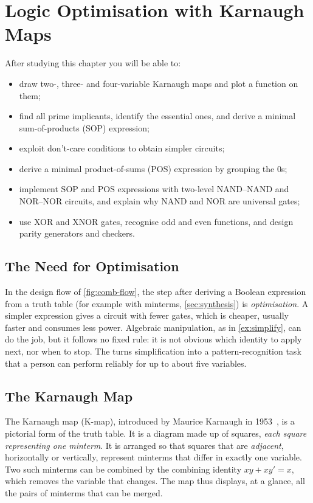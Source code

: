 \chapter{Logic Optimisation with Karnaugh Maps}\label{ch:kmap}

\begin{objectives}
After studying this chapter you will be able to:
\begin{itemize}
  \item draw two-, three- and four-variable Karnaugh maps and plot a function on them;
  \item find all prime implicants, identify the essential ones, and derive a minimal sum-of-products (SOP) expression;
  \item exploit don't-care conditions to obtain simpler circuits;
  \item derive a minimal product-of-sums (POS) expression by grouping the 0s;
  \item implement SOP and POS expressions with two-level NAND--NAND and NOR--NOR circuits, and explain why NAND and NOR are universal gates;
  \item use XOR and XNOR gates, recognise odd and even functions, and design parity generators and checkers.
\end{itemize}
\end{objectives}

\section{The Need for Optimisation}
In the design flow of \cref{fig:comb-flow}, the step after deriving a Boolean expression from a truth table (for example with minterms, \cref{sec:synthesis}) is \emph{optimisation}. A simpler expression gives a circuit with fewer gates, which is cheaper, usually faster and consumes less power. Algebraic manipulation, as in \cref{ex:simplify}, can do the job, but it follows no fixed rule: it is not obvious which identity to apply next, nor when to stop. The  turns simplification into a pattern-recognition task that a person can perform reliably for up to about five variables.


\section{The Karnaugh Map}
The Karnaugh map (K-map), introduced by Maurice Karnaugh in 1953~\cite{karnaugh1953}, is a pictorial form of the truth table. It is a diagram made up of squares, \emph{each square representing one minterm}. It is arranged so that squares that are \emph{adjacent}, horizontally or vertically, represent minterms that differ in exactly one variable. Two such minterms can be combined by the combining identity $xy+xy'=x$, which removes the variable that changes. The map thus displays, at a glance, all the pairs of minterms that can be merged.


